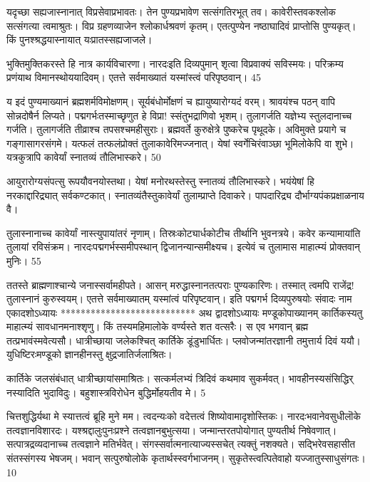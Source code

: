 यदृच्छा सह्यजास्नानात् विप्रसेवाप्रभावतः।
तेन पुण्यप्रभावेण सत्संगतिरभूत् तव।
कावेरीस्तवकश्लोक सत्संगत्या त्वमाश्रुतः।
विप्र ग्रहणव्याजेन श्लोकार्धश्रवणं कृतम्।
एतत्पुण्येन नष्ठाघादिवं प्राप्तोसि पुण्यकृत्।
किं पुनश्श्रद्धयास्नायात् यःप्रातस्सह्यजाजले।

भुक्तिमुक्तिकरस्ते हि नात्र कार्यविचारणा।
नारदःइति दिव्यपुमान् शृत्वा विप्रवाक्यं सविस्मयः।
परिक्रम्य प्रणंयाथ विमानस्थोययादिवम्।
एतत्ते सर्वमाख्यातं यस्मांस्त्वं परिपृष्ठवान्।
45

य इदं पुण्यमाख्यानं ब्रह्मशर्मविमोक्षणम्।
सूर्यबंधोर्मोक्षणं च ह्यायुष्यारोग्यदं वरम्।
श्रावयंश्च पठन् वापि सोन्नदोषैर्न लिप्यते।
पद्मगर्भःतस्माच्छृणुत हे विप्रा! स्संतुभद्राणिवो भृशम्।
तुलागर्जति यज्ञेभ्य स्तुलदानाच्च गर्जति।
तुलागर्जति तीव्राश्च तपसश्चमहीसुराः।
ब्रह्मवर्ते कुरुक्षेत्रे पुष्करेच पृथूदके।
अविमुक्ते प्रयागे च गङ्गासागरसंगमे।
यत्फलं तत्फलंप्रोक्तं तुलाकावेरिमज्जनात्।
येषां स्वर्गेचिरंवाञ्छा भूमिलोकेपि वा शुभे।
यत्रकुत्रापि कावेर्यां स्नातव्यं तौलिभास्करे।
50

आयुरारोग्यसंपत्सु रूपयौवनयोस्तथा।
येषां मनोरथस्तेस्तु स्नातव्यं तौलिभास्करे।
भयंयेषां हि नरकाद्दारिद्र्यात् सर्वकण्टकात्।
स्नातव्यंतैस्तुकावेर्यां तुलाम्प्राप्ते दिवाकरे।
पापदारिद्र्य दौर्भाग्यपंकप्रक्षाळनाय वै।

तुलास्नानाच्च कावेर्यां नास्त्युपायांतरं नृणाम्।
तिस्रःकोट्यार्धकोटीच तीर्थानि भुवनत्रये।
कवेर कन्यामायांति तुलायां रविसंक्रम।
नारदःपद्मगर्भस्समीपस्थान् द्विजानन्यान्समीक्ष्यच।
इत्येवं च तुलामास माहात्म्यं प्रोक्तवान् मुनिः।
55

ततस्ते ब्राह्मणाश्चान्ये जनास्सर्वामहीपते।
आसन् मरुद्धास्नानतत्पराः पुण्यकारिणः।
तस्मात् त्वमपि राजेंद्र! तुलास्नानं कुरुस्वयम्।
एतत्ते सर्वमाख्यातम् यस्मांत्वं परिपृष्टवान्।
इति पद्मगर्भ दिव्यपुरुषयोः संवादः नाम
एकादशोऽध्यायः
***************************
अथ द्वादशोऽध्यायः
मण्डूकोपाख्यानम् कार्तिकस्यतु माहात्म्यं सावधानमनाश्शृणु।
किं तस्यमहिमालोके वर्ण्यस्ते शत वत्सरैः।
स एव भगवान् ब्रह्म तत्प्रभावंस्मवेत्यसौ।
धात्रीच्छाया जलेकश्चित् कार्तिके डूंडुभार्धितः।
प्लवोजन्मांतरज्ञानी तमुत्तार्य दिवं ययौ।
युधिष्टिरःमण्डूको ज्ञानहीनस्तु क्षुद्रजातिर्जलाश्रितः।

कार्तिके जलसंबंधात् धात्रीच्छायांसमाश्रितः।
सत्कर्मलभ्यं त्रिदिवं कथमाव सुकर्मवत्।
भावहीनस्यसंसिद्धिर् नस्यादिति भुदाविदुः।
बहुशास्त्रविरोधेन बुद्धिर्मोहयतीव मे।
5

चित्तशुद्धिर्यथा मे स्यात्तत्वं ब्रूहि मुने मम।
त्वदन्यःको वदेत्तत्वं शिष्योवामादृशोस्तिकः।
नारदःभवानेवसुधीलॊके तत्वज्ञानविशारदः।
यश्श्रद्दालुःपुनःप्रश्ने तत्वज्ञानबुभुत्सया।
जन्मान्तरतपोयोगात् पुण्यतीर्थ निषेवणात्।
सत्पात्रद्रव्यदानाच्च तत्वज्ञाने मतिर्भवेत्।
संगस्सर्वात्मनात्याज्यस्सचेत् त्यक्तुं नशक्यते।
सद्भिरेवसहासीत संतस्संगस्य भेषजम्।
भवान् सत्पुरुषोलोके कृतार्थस्स्वर्गभाजनम्।
सुकृतेस्त्वत्पितेवाहो यज्जातुस्साधुसंगतः।
10

